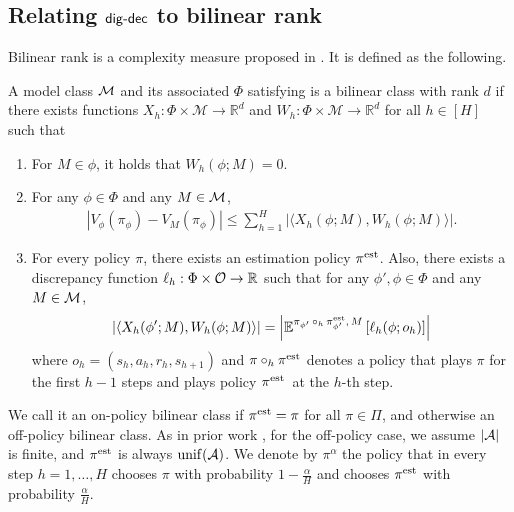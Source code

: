 \subsection{Relating $\mathsf{dig}\text{-}\mathsf{dec}$ to bilinear rank}\label{app: relate sto to bilinear}
Bilinear rank is a complexity measure proposed in \cite{du2021bilinear}. It is defined as the following. 


\begin{assumption}
\label{assum:sto bilinear}
A model class $\mathcal{M}$ and its associated $\Phi$ satisfying  is a bilinear class with rank $d$ if there exists functions $X_h: \Phi \times \mathcal{M} \rightarrow \mathbb{R}^d$ and  $W_h: \Phi \times \mathcal{M} \rightarrow \mathbb{R}^d$ for all $h\in[H]$ such that 
\begin{enumerate}[leftmargin=1.5em, nosep]
 \setlength{\itemsep}{0pt} %
    \setlength{\parskip}{0pt} 
    \setlength{\topsep}{0pt}
    \item For $M\in\phi$, it holds that $W_h(\phi; M)=0$. 
    \item For any $\phi \in \Phi$ and any $M \in \mathcal{M}$, 
    \begin{align*}
        \left|V_\phi(\pi_\phi) - V_{M}(\pi_\phi)\right| \leq \sum_{h=1}^H \left|\langle X_h(\phi; M), W_h(\phi; M)\rangle\right|.
    \end{align*}
    \item For every policy $\pi$, there exists an estimation policy $\pi^{\operatorname*{est}}$. Also, there exists a discrepancy function $\ell_h: \Phi \times \mathcal{O}  \rightarrow \mathbb{R}$ such that for any $\phi', \phi \in \Phi$ and any $M\in\mathcal{M}$,  
    \begin{align*}
        \left|\langle X_h(\phi'; M), W_h(\phi; M) \rangle\right| = \left|\mathbb{E}^{\pi_{\phi'} \,\circ_h\, \pi_{\phi'}^{\operatorname*{est}},\, M} \left[\ell_h(\phi; o_h)\right]\right|
    \end{align*}
    where $o_h = (s_h,a_h, r_h, s_{h+1})$ and $\pi \circ_h \pi^{\operatorname*{est}}$ denotes a policy that plays $\pi$ for the first $h-1$ steps and plays policy $\pi^{\operatorname*{est}}$\, at the $h$-th step. 
\end{enumerate}
We call it an on-policy bilinear class if $\pi^{\operatorname*{est}}=\pi$ for all $\pi\in\Pi$, and otherwise an off-policy bilinear class. As in prior work \citep{du2021bilinear, foster2021statistical}, for the off-policy case, we assume $|\mathcal{A}|$ is finite, and $\pi^{\operatorname*{est}}$ is always $\operatorname*{unif}(\mathcal{A})$. We denote by $\pi^\alpha$ the policy that in every step $h=1,\ldots, H$ chooses $\pi$ with probability $1-\frac{\alpha}{H}$ and chooses $\pi^{\operatorname*{est}}$ with probability $\frac{\alpha}{H}$. 
\end{assumption}

